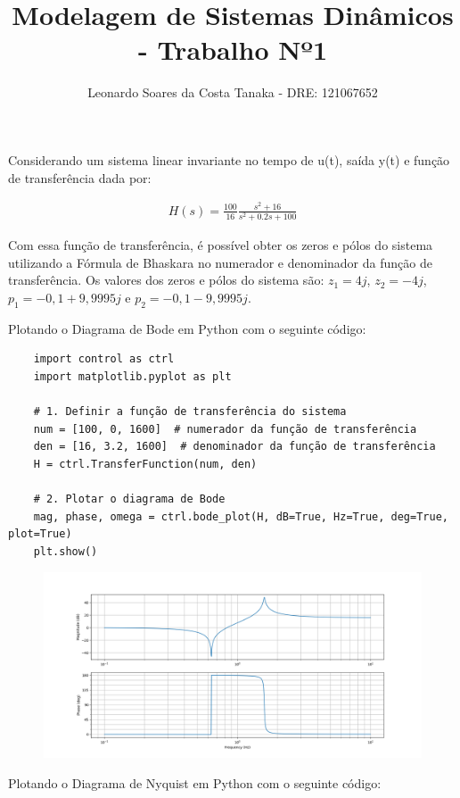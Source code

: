 \documentclass[10pt]{article}
\title{Modelagem de Sistemas Dinâmicos - Trabalho Nº1}
\author{
    Leonardo Soares da Costa Tanaka - DRE: 121067652
}
\date{}
\begin{document}
\maketitle
\thispagestyle{capa}
\newpage

Considerando um sistema linear invariante no tempo de u(t), saída y(t) e 
função de transferência dada por:

\begin{align*}
    H(s) = \frac{100}{16} \frac{s^2 + 16}{s^2 + 0.2s + 100}
\end{align*}

Com essa função de transferência, é possível obter os zeros e pólos do sistema utilizando a Fórmula de Bhaskara no numerador e denominador da função de transferência.
Os valores dos zeros e pólos do sistema são:
$z_1 = 4j$, $z_2 = -4j$, $p_1 = -0,1 + 9,9995j$ e $p_2 = -0,1 - 9,9995j$.

Plotando o Diagrama de Bode em Python com o seguinte código:

\begin{verbatim}
    import control as ctrl
    import matplotlib.pyplot as plt

    # 1. Definir a função de transferência do sistema
    num = [100, 0, 1600]  # numerador da função de transferência
    den = [16, 3.2, 1600]  # denominador da função de transferência
    H = ctrl.TransferFunction(num, den)

    # 2. Plotar o diagrama de Bode
    mag, phase, omega = ctrl.bode_plot(H, dB=True, Hz=True, deg=True, plot=True)
    plt.show()
\end{verbatim}

\begin{figure}[h]
    \includegraphics[scale=0.45]{bode.png}
    \centering
\end{figure}

Plotando o Diagrama de Nyquist em Python com o seguinte código:
\end{document}
